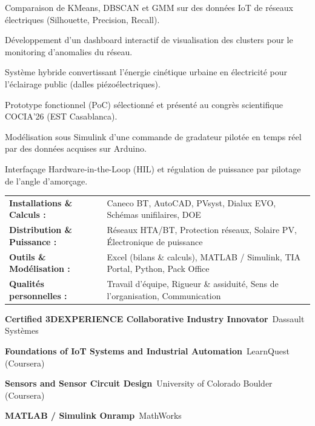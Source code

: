 \documentclass[10pt,a4paper]{../altacv}
\begin{document}
\begin{cvitems}
  \item Comparaison de KMeans, DBSCAN et GMM sur des données IoT de réseaux électriques (Silhouette, Precision, Recall).
  \item Développement d’un dashboard interactif de visualisation des clusters pour le monitoring d’anomalies du réseau.
\end{cvitems}
\vspace{2pt}
\begin{cvitems}
  \item Système hybride convertissant l’énergie cinétique urbaine en électricité pour l’éclairage public (dalles piézoélectriques).
  \item Prototype fonctionnel (PoC) sélectionné et présenté au congrès scientifique COCIA’26 (EST Casablanca).
\end{cvitems}
\vspace{2pt}
\begin{cvitems}
  \item Modélisation sous Simulink d’une commande de gradateur pilotée en temps réel par des données acquises sur Arduino.
  \item Interfaçage Hardware-in-the-Loop (HIL) et régulation de puissance par pilotage de l’angle d’amorçage.
\end{cvitems}

{\small
\begin{tabular}{@{}ll@{}}
\textbf{Installations \& Calculs :} & Caneco BT, AutoCAD, PVsyst, Dialux EVO, Schémas unifilaires, DOE \\[1.5pt]
\textbf{Distribution \& Puissance :} & Réseaux HTA/BT, Protection réseaux, Solaire PV, Électronique de puissance \\[1.5pt]
\textbf{Outils \& Modélisation :} & Excel (bilans \& calculs), MATLAB / Simulink, TIA Portal, Python, Pack Office \\[1.5pt]
\textbf{Qualités personnelles :} & Travail d’équipe, Rigueur \& assiduité, Sens de l’organisation, Communication
\end{tabular}
}

\begin{cvitems}
  \item \textbf{Certified 3DEXPERIENCE Collaborative Industry Innovator}~\hfill {\color{emphasis}Dassault Systèmes}
  \item \textbf{Foundations of IoT Systems and Industrial Automation}~\hfill {\color{emphasis}LearnQuest (Coursera)}
  \item \textbf{Sensors and Sensor Circuit Design}~\hfill {\color{emphasis}University of Colorado Boulder (Coursera)}
  \item \textbf{MATLAB / Simulink Onramp}~\hfill {\color{emphasis}MathWorks}
\end{cvitems}

\cvactivites
\cvlangues
\end{document}
